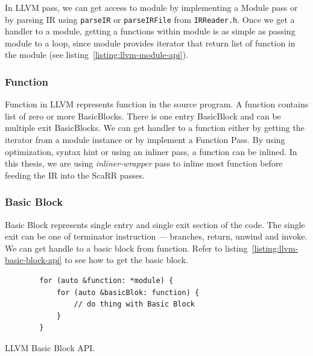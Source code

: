 In LLVM pass, we can get access to module by implementing a Module pass or by
parsing IR using \texttt{parseIR} or \texttt{parseIRFile} from
\texttt{IRReader.h}. Once we get a handler to a module, getting a functions
within module is as simple as passing module to a loop, since module provides
iterator that return list of function in the module (see
listing~\ref{listing:llvm-module-api}).


\subsubsection{Function}

Function in LLVM represents function in the source program. A function contains
list of zero or more BasicBlocks. There is one entry BasicBlock and can be
multiple exit BasicBlocks. We can get handler to a function either by getting
the iterator from a module instance or by implement a Function Pass. By using
optimization, syntax hint or using an inliner pass, a function can be inlined.
In this thesis, we are using \emph{inliner-wrapper} pass to inline most function
before feeding the IR into the ScaRR passes.

\subsubsection{Basic Block}

Basic Block represents single entry and single exit section of the code. The
single exit can be one of terminator instruction — branches, return, unwind and
invoke. We can get handle to a basic block from function. Refer to
listing~\ref{listing:llvm-basic-block-api} to see how to get the basic block.

\begin{listing}[htbp]
    \begin{verbatim}
        for (auto &function: *module) {
            for (auto &basicBlok: function) {
                // do thing with Basic Block
            }
        }
    \end{verbatim}
    \caption{LLVM Basic Block API.}    
    \label{listing:llvm-basic-block-api}
\end{listing}

